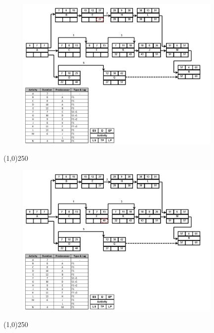 \begin{frame}
\begin{figure}
	\centering
		\includegraphics[width = 10.0cm]{oldnotes/Slide230.jpg}
\end{figure}
\end{frame}
\begin{center}\line(1,0){250}\end{center}




\begin{frame}
\begin{figure}
	\centering
		\includegraphics[width = 10.0cm]{oldnotes/Slide231.jpg}
\end{figure}
\end{frame}
\begin{center}\line(1,0){250}\end{center}





